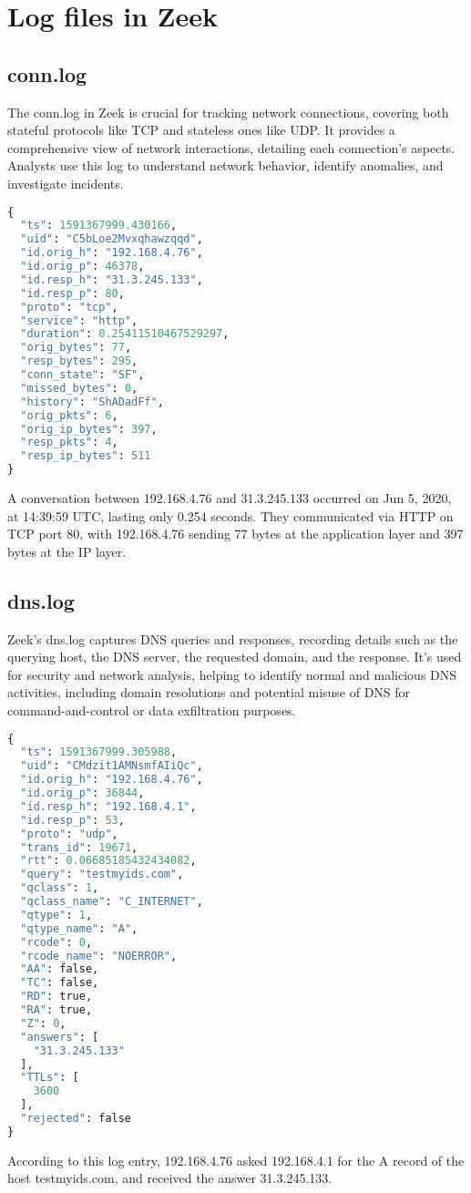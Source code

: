 \section{Log files in Zeek}
\subsection{conn.log}
The conn.log in Zeek is crucial for tracking network connections, covering both stateful protocols like TCP and stateless ones like UDP. It provides a comprehensive view of network interactions, detailing each connection's aspects. Analysts use this log to understand network behavior, identify anomalies, and investigate incidents. 
\begin{lstlisting}[language=Python, caption= conn.log entry]
{
  "ts": 1591367999.430166,
  "uid": "C5bLoe2Mvxqhawzqqd",
  "id.orig_h": "192.168.4.76",
  "id.orig_p": 46378,
  "id.resp_h": "31.3.245.133",
  "id.resp_p": 80,
  "proto": "tcp",
  "service": "http",
  "duration": 0.25411510467529297,
  "orig_bytes": 77,
  "resp_bytes": 295,
  "conn_state": "SF",
  "missed_bytes": 0,
  "history": "ShADadFf",
  "orig_pkts": 6,
  "orig_ip_bytes": 397,
  "resp_pkts": 4,
  "resp_ip_bytes": 511
}
\end{lstlisting}
A conversation between 192.168.4.76 and 31.3.245.133 occurred on Jun 5, 2020, at 14:39:59 UTC, lasting only 0.254 seconds. They communicated via HTTP on TCP port 80, with 192.168.4.76 sending 77 bytes at the application layer and 397 bytes at the IP layer.

\subsection{dns.log}
Zeek's dns.log captures DNS queries and responses, recording details such as the querying host, the DNS server, the requested domain, and the response. It's used for security and network analysis, helping to identify normal and malicious DNS activities, including domain resolutions and potential misuse of DNS for command-and-control or data exfiltration purposes.
\begin{lstlisting}[language=Python, caption= dns.log entry]
{
  "ts": 1591367999.305988,
  "uid": "CMdzit1AMNsmfAIiQc",
  "id.orig_h": "192.168.4.76",
  "id.orig_p": 36844,
  "id.resp_h": "192.168.4.1",
  "id.resp_p": 53,
  "proto": "udp",
  "trans_id": 19671,
  "rtt": 0.06685185432434082,
  "query": "testmyids.com",
  "qclass": 1,
  "qclass_name": "C_INTERNET",
  "qtype": 1,
  "qtype_name": "A",
  "rcode": 0,
  "rcode_name": "NOERROR",
  "AA": false,
  "TC": false,
  "RD": true,
  "RA": true,
  "Z": 0,
  "answers": [
    "31.3.245.133"
  ],
  "TTLs": [
    3600
  ],
  "rejected": false
}
\end{lstlisting}
According to this log entry, 192.168.4.76 asked 192.168.4.1 for the A record of the host testmyids.com, and received the answer 31.3.245.133. 

